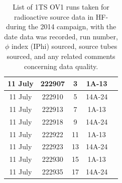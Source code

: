 \begin{table}[htb]
{\begin{tabular}{|c|c|c|c|c|}
  \hline
  11 July & 222907 & 3 & 1A-13 & \\
  \hline
  11 July & 222910 & 5 & 14A-24 & \\
  \hline
  11 July & 222913 & 7 & 1A-13 & \\
  \hline
  11 July & 222918 & 9 & 14A-24 & \\
  \hline
  11 July & 222922 & 11 & 1A-13 & \\
  \hline
  11 July & 222923 & 13 & 14A-24 & \\
  \hline
  11 July & 222930 & 15 & 1A-13 & \\
  \hline
  11 July & 222935 & 17 & 14A-24 & \\
  \hline
  \end{tabular}}
  \caption{List of 1TS OV1 runs taken for radioactive source data in HF- during the 2014
  campaign, with the date data was recorded, run number, $\phi$ index (IPhi) sourced, source
  tubes sourced, and any related comments concerning data quality.}
  \label{tab:2014HFM_Runs_1TSOV1}
\end{table}

